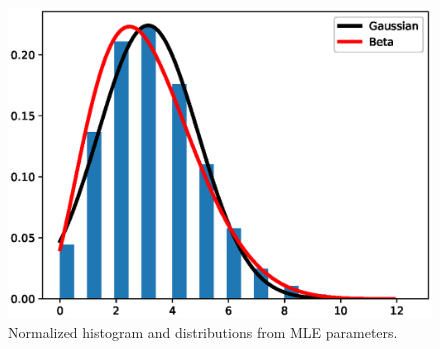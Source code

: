 \documentclass[11pt]{article}
\begin{document}
    \begin{figure}[H]
        \begin{center}
            \includegraphics[width=.5\textwidth]{plots/hist_distributions.eps}
        \end{center}
        \caption{Normalized histogram and distributions from MLE parameters.}
    \end{figure}
\end{document}
